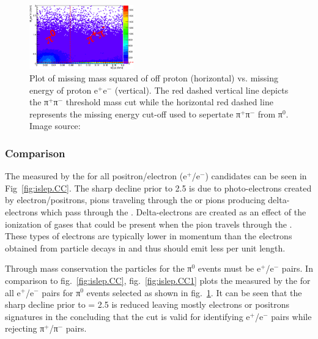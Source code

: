 \begin{figure}\begin{center}
\includegraphics[width=0.4\textwidth]{figures/lepton/Lepfeature_cuts.eps}
\caption[Cuts Applied to Isolate π$^0$ and π$^+$ π$^-$ for  Validation]{\label{fig:islep.cuts}Plot of missing mass squared of off proton (horizontal) vs. missing energy of proton e$^+$e$^-$ (vertical). The red dashed vertical line depicts the π$^+$π$^-$ threshold mass cut while the horizontal red dashed line represents the missing energy cut-off used to sepertate π$^+$π$^-$ from π$^0$.  Image source:~\cite{clas.thesis.kunkel}}
\end{center}\end{figure}

\subsubsection{\label{sec:data.lepton.cc} Comparison}

The  measured by the  for all positron/electron (e$^+$/e$^-$) candidates can be seen in Fig~\ref{fig:islep.CC}. The sharp decline prior to 2.5  is due to photo-electrons created by electron/positrons, pions traveling through the  or pions producing delta-electrons which pass through the . Delta-electrons are created as an effect of the ionization of gases that could be present when the pion travels through the . These types of electrons are typically lower in momentum than the electrons obtained from particle decays in  and thus should emit less  per unit length.

Through mass conservation the particles for the π$^0$ events must be e$^+$/e$^-$ pairs. In comparison to fig.~\ref{fig:islep.CC}, fig.~\ref{fig:islep.CC1} plots the  measured by the  for all e$^+$/e$^-$ pairs for π$^0$ events selected as shown in fig.~\ref{fig:islep.cuts}. It can be seen that the sharp decline prior to  = 2.5 is reduced leaving mostly electrons or positrons signatures in the  concluding that the    cut is valid for identifying e$^+$/e$^-$ pairs while rejecting π$^+$/π$^-$ pairs.

